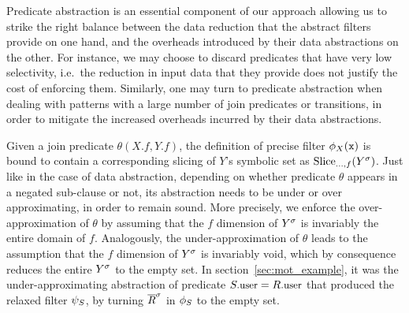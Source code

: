 Predicate abstraction is an essential component of our approach
allowing us to strike the right balance between the data reduction that the
abstract filters provide on one hand, and the overheads introduced by their
data abstractions on the other.
For instance, we may choose to discard
predicates that have very low selectivity, i.e.\ the reduction in input 
data
that they provide does not justify the cost of enforcing them.
Similarly, one may turn to predicate abstraction when dealing with patterns
 with
a large number of join predicates or transitions, in order to mitigate the
increased overheads incurred by their data abstractions.


Given a join predicate $\theta(X.f, Y.f)$, the definition of precise filter 
$\precs{X}(\symv{x})$ is bound to contain a corresponding slicing of $Y$'s 
symbolic set as $\slice{\syms{Y}}{...,f}$. 
Just like in the case of data abstraction, depending on whether predicate 
$\theta$ appears in a negated sub-clause or not, its abstraction needs to be 
under or over approximating, in order to remain sound.
More precisely, we enforce the over-approximation of $\theta$ by assuming that 
the $f$ dimension of $\syms{Y}$ is invariably the entire domain of $f$.
Analogously, the under-approximation of $\theta$ leads to the assumption that 
the $f$ dimension of $\syms{Y}$ is invariably void, which by consequence 
reduces the entire $\syms{Y}$ to the empty set.
In section~\ref{sec:mot_example}, it was the under-approximating abstraction of 
predicate $\facc{S}{user} = \facc{R}{user}$ that produced the relaxed filter
$\PrecedesPPP$, by turning $\syms{\oR}$ in $\PrecedesP$ to the empty set.  
 
